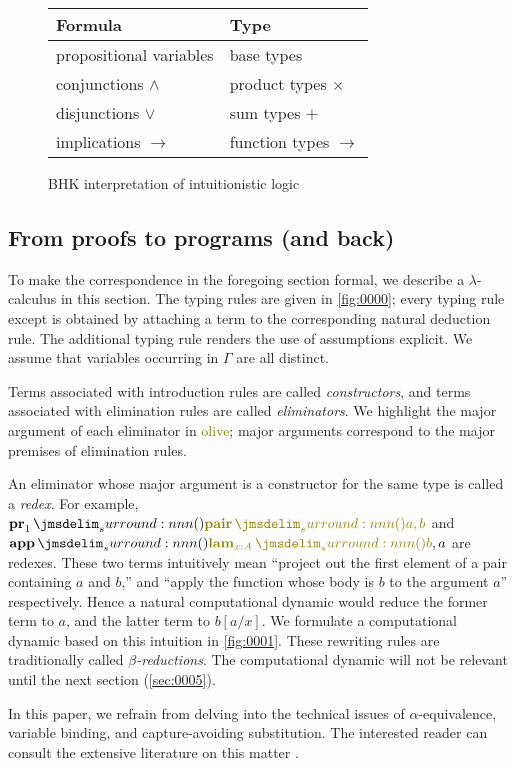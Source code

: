 \documentclass[a4paper]{article}
\begin{document}
\begin{figure}
  \centering
  \begin{tabular}{l|l}
    \hline
    Formula & Type\\
    \hline
    propositional variables & base types\\
    conjunctions $\wedge$ & product types $\times$\\
    disjunctions $\vee$ & sum types $+$\\
    implications $\to$ & function types $\to$\\
    \hline
  \end{tabular}
  \caption{BHK interpretation of intuitionistic logic}
  \label{0000}
\end{figure}

\subsection{From proofs to programs (and back)}
\label{sec:0002}

To make the correspondence in the foregoing section formal, we describe a $\lambda$-calculus in this section.
The typing rules are given in \cref{fig:0000}; every typing rule except \rVar{} is obtained by attaching a term to the corresponding natural deduction rule.
The additional typing rule \rVar{} renders the use of assumptions explicit.
We assume that variables occurring in $\Gamma$ are all distinct.

Terms associated with introduction rules are called \emph{constructors}, and terms associated with elimination rules are called \emph{eliminators}.
We highlight the major argument of each eliminator in \textcolor{olive}{olive}; major arguments correspond to the major premises of elimination rules.

An eliminator whose major argument is a constructor for the same type is called a \emph{redex}.
For example, $\tmPrl{\tmPair{a}{b}}$ and $\tmApp{\tmLam{x:A}{b}}{a}$ are redexes.
These two terms intuitively mean ``project out the first element of a pair containing $a$ and $b$,'' and ``apply the function whose body is $b$ to the argument $a$'' respectively.
Hence a natural computational dynamic would reduce the former term to $a$, and the latter term to $b[a/x]$.
We formulate a computational dynamic based on this intuition in \cref{fig:0001}.
These rewriting rules are traditionally called \emph{$\beta$-reductions}.
The computational dynamic will not be relevant until the next section (\cref{sec:0005}).

In this paper, we refrain from delving into the technical issues of $\alpha$-equivalence, variable binding, and capture-avoiding substitution.
The interested reader can consult the extensive literature on this matter \cite{Bruijn72,Chargueraud12}.
\end{document}
